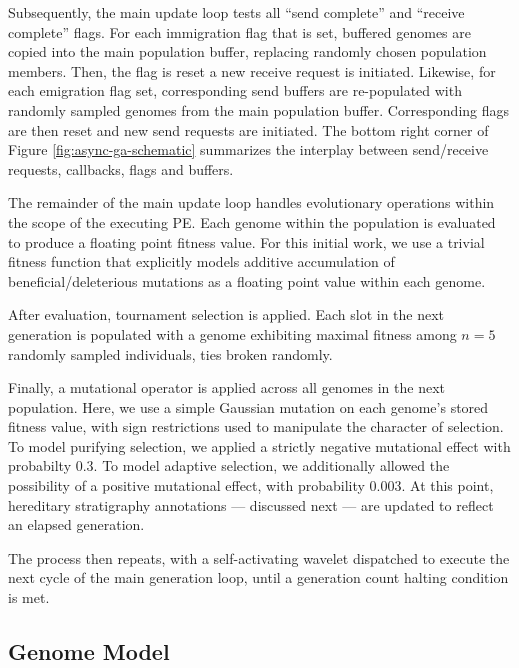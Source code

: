 Subsequently, the main update loop tests all ``send complete'' and ``receive complete'' flags.
For each immigration flag that is set, buffered genomes are copied into the main population buffer, replacing randomly chosen population members.
Then, the flag is reset a new receive request is initiated.
Likewise, for each emigration flag set, corresponding send buffers are re-populated with randomly sampled genomes from the main population buffer.
Corresponding flags are then reset and new send requests are initiated.
The bottom right corner of Figure \ref{fig:async-ga-schematic} summarizes the interplay between send/receive requests, callbacks, flags and buffers.

The remainder of the main update loop handles evolutionary operations within the scope of the executing PE.
Each genome within the population is evaluated to produce a floating point fitness value.
For this initial work, we use a trivial fitness function that explicitly models additive accumulation of beneficial/deleterious mutations as a floating point value within each genome.

After evaluation, tournament selection is applied. %
Each slot in the next generation is populated with a genome exhibiting maximal fitness among $n=5$ randomly sampled individuals, ties broken randomly.

Finally, a mutational operator is applied across all genomes in the next population.
Here, we use a simple Gaussian mutation on each genome's stored fitness value, with sign restrictions used to manipulate the character of selection.
To model purifying selection, we applied a strictly negative mutational effect with probabilty 0.3.
To model adaptive selection, we additionally allowed the possibility of a positive mutational effect, with probability 0.003.
At this point, hereditary stratigraphy annotations --- discussed next --- are updated to reflect an elapsed generation.

The process then repeats, with a self-activating wavelet dispatched to execute the next cycle of the main generation loop, until a generation count halting condition is met.

\subsection{Genome Model}

